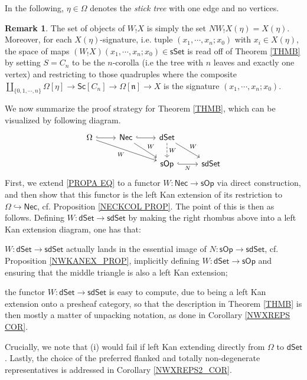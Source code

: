 \documentclass[a4paper,10pt
,draft
]{article}%
\numberwithin{equation}{section}
\numberwithin{figure}{section}
\theoremstyle{definition} %
\newtheorem{remark}[equation]{Remark}%
\newcommand{\sOp}{\ensuremath{\mathsf{sOp}}}%
\newcommand{\dSet}{\mathsf{dSet}}
\newcommand{\1}{\ensuremath{\mathbbm 1}}%
\begin{document}
In the following, $\eta \in \Omega$
denotes the \emph{stick tree} with one edge and no vertices.

\begin{remark}
	The set of objects of $W_! X$ is simply the set
	$NW_! X(\eta) = X(\eta)$.
	Moreover, for each $X(\eta)$-signature, 
	i.e. tuple $(x_1,\cdots,x_n;x_0)$ with $x_i \in X(\eta)$,
	the space of maps
	$(W_! X)(x_1,\cdots,x_n;x_0) \in \mathsf{sSet}$
	is read off of Theorem \ref{THMB}
	by setting $S=C_n$ to be the $n$-corolla
	(i.e the tree with $n$ leaves and exactly one vertex)
	and restricting to those quadruples where the composite
	$\coprod_{\{0,1,\cdots,n\}}\Omega[\eta] 
	\to \mathsf{Sc}[C_n] \to 
	\Omega[\mathfrak{n}] \to X$
	is the signature $(x_1,\cdots,x_n;x_0)$.
\end{remark}




We now summarize the proof strategy for Theorem \ref{THMB},
which can be visualized by following diagram.
\begin{equation}\label{KEYSTRAT EQ}
\begin{tikzcd}
\Omega \ar[hookrightarrow]{r}
\ar{rrd}[swap]{W} 
&
\mathsf{Nec}
\ar[hookrightarrow]{r}
\ar{rd}{W}
&
\mathsf{dSet} \ar{rd}{W}
\ar[dashed]{d}{W}
\\
&&
\mathsf{sOp} \ar[hookrightarrow]{r}[swap]{N} &
\mathsf{sdSet}
\end{tikzcd}
\end{equation}
First, 
we extend \eqref{PROPA EQ} to a functor
$W \colon \mathsf{Nec} \to \sOp$
via direct construction,
and then show that this functor is the left Kan extension of 
its restriction to 
$\Omega \hookrightarrow \mathsf{Nec}$,
cf. Proposition \ref{NECKCOL PROP}.
The point of this is then as follows.
Defining $W \colon \mathsf{dSet} \to \mathsf{sdSet}$
by making the right rhombus above into a left Kan extension diagram,
one has that:
\begin{enumerate*}
\item
$W \colon \mathsf{dSet} \to \mathsf{sdSet}$
actually lands in the essential image
of $N \colon \sOp \to \mathsf{sdSet}$,
cf. Proposition \ref{NWKANEX_PROP},
implicitly defining 
$W \colon \mathsf{dSet} \to \sOp$
and ensuring that the middle triangle is also a left Kan extension;
\item
the functor 
$W \colon \mathsf{dSet} \to \mathsf{sdSet}$
is easy to compute, due to being a left Kan extension onto a presheaf category,
so that the description in Theorem \ref{THMB}
is then mostly a matter of unpacking notation,
as done in Corollary \ref{NWXREPS COR}.
\end{enumerate*}
Crucially, we note that (i) would fail
if left Kan extending directly from 
$\Omega$ to $\dSet$. 
Lastly, the choice of the preferred 
flanked and totally non-degenerate 
representatives is addressed in 
Corollary \ref{NWXREPS2_COR}.
\end{document}
